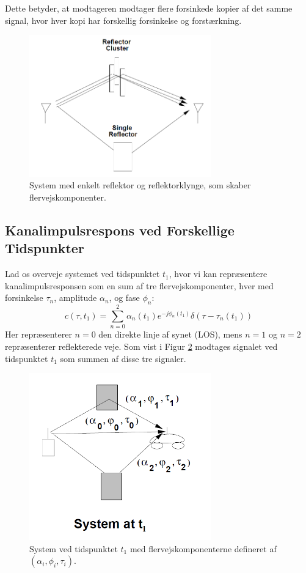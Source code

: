 \documentclass[a4paper,12pt]{book}
\begin{document}
	Dette betyder, at modtageren modtager flere forsinkede kopier af det samme signal, hvor hver kopi har forskellig forsinkelse og forstærkning.
	
	\begin{figure}[h!]
		\centering
		\includegraphics[width=0.7\textwidth]{fig/fig14.png}
		\caption{System med enkelt reflektor og reflektorklynge, som skaber flervejskomponenter.}
		\label{fig:reflector_cluster}
	\end{figure}
	
	\subsection{Kanalimpulsrespons ved Forskellige Tidspunkter}
	Lad os overveje systemet ved tidspunktet \( t_1 \), hvor vi kan repræsentere kanalimpulsresponsen som en sum af tre flervejskomponenter, hver med forsinkelse \( \tau_n \), amplitude \( \alpha_n \), og fase \( \phi_n \):
	\[
	c(\tau, t_1) = \sum_{n=0}^{2} \alpha_n(t_1) e^{-j \phi_n(t_1)} \delta(\tau - \tau_n(t_1))
	\]
	Her repræsenterer \( n=0 \) den direkte linje af synet (LOS), mens \( n=1 \) og \( n=2 \) repræsenterer reflekterede veje. Som vist i Figur \ref{fig:system_t1} modtages signalet ved tidspunktet \( t_1 \) som summen af disse tre signaler.
	
	\begin{figure}[h!]
		\centering
		\includegraphics[width=0.7\textwidth]{fig/fig15.png}
		\caption{System ved tidspunktet \( t_1 \) med flervejskomponenterne defineret af \( (\alpha_i, \phi_i, \tau_i) \).}
		\label{fig:system_t1}
	\end{figure}
	
\end{document}
